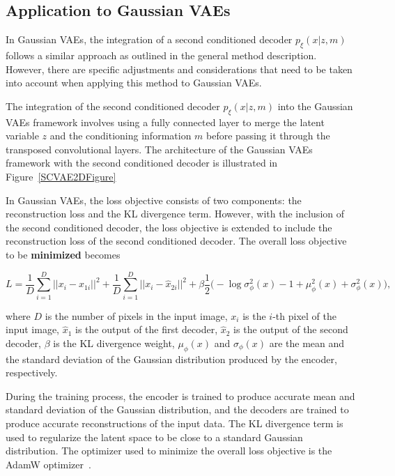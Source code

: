 \subsection{Application to Gaussian VAEs}

In Gaussian VAEs, the integration of a second conditioned decoder
$p_\xi(x|z,m)$ follows a similar approach as outlined in the general method
description. However, there are specific adjustments and considerations that
need to be taken into account when applying this method to Gaussian VAEs.

The integration of the second conditioned decoder $p_\xi(x|z,m)$ into the
Gaussian VAEs framework involves using a fully connected layer to merge the
latent variable $z$ and the conditioning information $m$ before passing it
through the transposed convolutional layers. The architecture of the Gaussian
VAEs framework with the second conditioned decoder is illustrated in
Figure~\ref{SCVAE2DFigure}

In Gaussian VAEs, the loss objective consists of two components: the
reconstruction loss and the KL divergence term. However, with the inclusion of
the second conditioned decoder, the loss objective is extended to include the
reconstruction loss of the second conditioned decoder. The overall loss
objective to be \textbf{minimized} becomes

\[ L = \frac{1}{D} \sum_{i=1}^{D} ||x_i - \hat{x}_{1i} ||^2 + \frac{1}{D} \sum_{i=1}^{D} || x_i - \hat{x}_{2i} ||^2 + \beta  \frac{1}{2} \biggl( -\log \sigma^2_\phi(x) - 1 + \mu^2_\phi(x) + \sigma^2_\phi(x) \biggr), \]

where $D$ is the number of pixels in the input image, $x_i$ is the $i$-th pixel
of the input image, $\hat{x}_1$ is the output of the first decoder, $\hat{x}_2$
is the output of the second decoder, $\beta$ is the KL divergence weight,
$\mu_\phi(x)$ and $\sigma_\phi(x)$ are the mean and the standard deviation of
the Gaussian distribution produced by the encoder, respectively.

During the training process, the encoder is trained to produce accurate mean
and standard deviation of the Gaussian distribution, and the decoders are
trained to produce accurate reconstructions of the input data. The KL
divergence term is used to regularize the latent space to be close to a
standard Gaussian distribution. The optimizer used to minimize the overall loss
objective is the AdamW optimizer~\cite{AdamW}.

